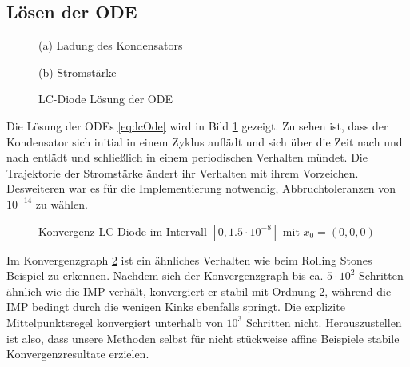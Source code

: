 \subsection{Lösen der ODE}
\begin{figure}[H]
\footnotesize 
\centering
\begin{minipage}[b]{0.49\linewidth}

\caption*{(a) Ladung des Kondensators}
\end{minipage}
\begin{minipage}[b]{0.49\linewidth}

\caption*{(b) Stromstärke}
\end{minipage}
\caption{LC-Diode Lösung der ODE}
\label{fig:lc_solution}
\end{figure}
Die Lösung der ODEs \eqref{eq:lcOde} wird in Bild \ref{fig:lc_solution} gezeigt. Zu sehen ist, dass der Kondensator sich initial in einem Zyklus auflädt und sich über die Zeit nach und nach entlädt und schließlich in einem periodischen Verhalten mündet. Die Trajektorie der Stromstärke ändert ihr Verhalten mit ihrem Vorzeichen. Desweiteren war es für die Implementierung notwendig, Abbruchtoleranzen von $10^{-14}$ zu wählen. 

\begin{figure}
\centering

\caption{Konvergenz LC Diode im Intervall $[0,1.5\cdot 10^{-8}]$ mit $x_0=(0,0,0)$}
\label{fig:lcConvergence}
\end{figure}
Im Konvergenzgraph \ref{fig:lcConvergence} ist ein ähnliches Verhalten wie beim Rolling Stones Beispiel zu erkennen. Nachdem sich der Konvergenzgraph bis ca. $5\cdot 10^2$ Schritten ähnlich wie die IMP verhält, konvergiert er stabil mit Ordnung 2, während die IMP bedingt durch die wenigen Kinks ebenfalls springt. Die explizite Mittelpunktsregel konvergiert unterhalb von $10^3$ Schritten nicht. 
Herauszustellen ist also, dass unsere Methoden selbst für nicht stückweise affine Beispiele stabile Konvergenzresultate erzielen.

